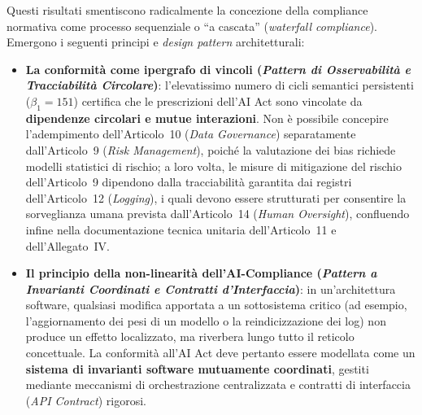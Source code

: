 \documentclass[12pt,a4paper,oneside]{report}
\begin{document}
Questi risultati smentiscono radicalmente la concezione della compliance normativa come processo sequenziale o ``a cascata'' (\emph{waterfall compliance}). Emergono i seguenti principi e \emph{design pattern} architetturali:
\begin{itemize}
    \item \textbf{La conformità come ipergrafo di vincoli (\emph{Pattern di Osservabilità e Tracciabilità Circolare})}: l'elevatissimo numero di cicli semantici persistenti ($\beta_1 = 151$) certifica che le prescrizioni dell'AI Act sono vincolate da \textbf{dipendenze circolari e mutue interazioni}. Non è possibile concepire l'adempimento dell'Articolo~10 (\emph{Data Governance}) separatamente dall'Articolo~9 (\emph{Risk Management}), poiché la valutazione dei bias richiede modelli statistici di rischio; a loro volta, le misure di mitigazione del rischio dell'Articolo~9 dipendono dalla tracciabilità garantita dai registri dell'Articolo~12 (\emph{Logging}), i quali devono essere strutturati per consentire la sorveglianza umana prevista dall'Articolo~14 (\emph{Human Oversight}), confluendo infine nella documentazione tecnica unitaria dell'Articolo~11 e dell'Allegato~IV.
    \item \textbf{Il principio della non-linearità dell'AI-Compliance (\emph{Pattern a Invarianti Coordinati e Contratti d'Interfaccia})}: in un'architettura software, qualsiasi modifica apportata a un sottosistema critico (ad esempio, l'aggiornamento dei pesi di un modello o la reindicizzazione dei log) non produce un effetto localizzato, ma riverbera lungo tutto il reticolo concettuale. La conformità all'AI Act deve pertanto essere modellata come un \textbf{sistema di invarianti software mutuamente coordinati}, gestiti mediante meccanismi di orchestrazione centralizzata e contratti di interfaccia (\emph{API Contract}) rigorosi.
\end{itemize}
\end{document}
